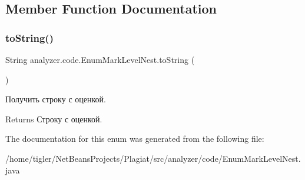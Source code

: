\subsection{Member Function Documentation}
\mbox{\label{enumanalyzer_1_1code_1_1EnumMarkLevelNest_a00997fede2fe10301bff2b5a023685d3}} 
\subsubsection{\texorpdfstring{to\+String()}{toString()}}
{\footnotesize\ttfamily String analyzer.\+code.\+Enum\+Mark\+Level\+Nest.\+to\+String (\begin{DoxyParamCaption}{ }\end{DoxyParamCaption})\hspace{0.3cm}{\ttfamily [inline]}}

Получить строку с оценкой. \begin{DoxyReturn}{Returns}
Строку с оценкой. 
\end{DoxyReturn}


The documentation for this enum was generated from the following file\+:\begin{DoxyCompactItemize}
\item 
/home/tigler/\+Net\+Beans\+Projects/\+Plagiat/src/analyzer/code/Enum\+Mark\+Level\+Nest.\+java\end{DoxyCompactItemize}
